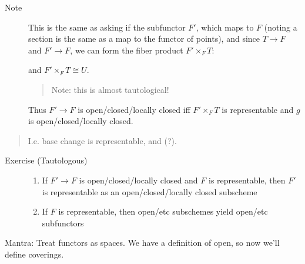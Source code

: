 \begin{description}
\item[Note]
This is the same as asking if the subfunctor \(F'\), which maps to \(F\)
(noting a section is the same as a map to the functor of points), and
since \(T\to F\) and \(F' \to F\), we can form the fiber product
\(F' \times_F T\):

\begin{center}
\end{center}

and \(F' \times_F T \cong U\).

\begin{quote}
Note: this is almost tautological!
\end{quote}

Thus \(F' \to F\) is open/closed/locally closed iff \(F' \times_F T\) is
representable and \(g\) is open/closed/locally closed.
\end{description}

\begin{quote}
I.e. base change is representable, and (?).
\end{quote}

\begin{description}
\item[Exercise (Tautologous)]
\hfill

\begin{enumerate}
\def\labelenumi{\arabic{enumi}.}
\item
  If \(F' \to F\) is open/closed/locally closed and \(F\) is
  representable, then \(F'\) is representable as an open/closed/locally
  closed subscheme
\item
  If \(F\) is representable, then open/etc subschemes yield open/etc
  subfunctors
\end{enumerate}
\end{description}

Mantra: Treat functors as spaces. We have a definition of open, so now
we'll define coverings.

